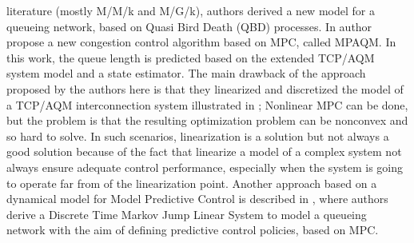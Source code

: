 literature (mostly M/M/k and M/G/k), authors derived a new model for a queueing network, based on Quasi Bird Death (QBD) processes. In \cite{WANG2012120} author propose a new congestion control algorithm based on MPC, called MPAQM. In this work, the queue length is predicted based on the extended TCP/AQM system model and a state estimator. The main drawback of the approach proposed by the authors here is that they linearized and discretized the model of a TCP/AQM interconnection system illustrated in \cite{TCPSTATESPACE}; Nonlinear MPC can be done, but the problem is that the resulting optimization problem can be nonconvex and so hard to solve. In such scenarios, linearization is a solution but not always a good solution because of the fact that linearize a model of a complex system not always ensure adequate control performance, especially when the system is going to operate far from of the linearization point. Another approach based on a dynamical model for Model Predictive Control is described in \cite{SchoffMPC}, where authors derive a Discrete Time Markov Jump Linear System to model a queueing network with the aim of defining predictive control policies, based on MPC.
%
%
